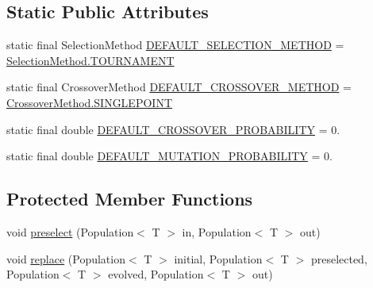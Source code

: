 \subsection*{Static Public Attributes}
\begin{DoxyCompactItemize}
\item 
static final Selection\-Method \hyperlink{classjenes_1_1stage_1_1operator_1_1common_1_1_deterministic_crowder_3_01_t_01extends_01_chromosome_01_4_a5ca3f3abce0f3163383ed9158b154289}{D\-E\-F\-A\-U\-L\-T\-\_\-\-S\-E\-L\-E\-C\-T\-I\-O\-N\-\_\-\-M\-E\-T\-H\-O\-D} = \hyperlink{enumjenes_1_1stage_1_1operator_1_1common_1_1_deterministic_crowder_3_01_t_01extends_01_chromosome_01_4_1_1_selection_method_acf3d13065b946fb2e0e86d3cf8ca49fd}{Selection\-Method.\-T\-O\-U\-R\-N\-A\-M\-E\-N\-T}
\item 
static final Crossover\-Method \hyperlink{classjenes_1_1stage_1_1operator_1_1common_1_1_deterministic_crowder_3_01_t_01extends_01_chromosome_01_4_aa09cba6e344d7681789f11213d6cccd0}{D\-E\-F\-A\-U\-L\-T\-\_\-\-C\-R\-O\-S\-S\-O\-V\-E\-R\-\_\-\-M\-E\-T\-H\-O\-D} = \hyperlink{enumjenes_1_1stage_1_1operator_1_1common_1_1_deterministic_crowder_3_01_t_01extends_01_chromosome_01_4_1_1_crossover_method_a074512cc7f136f107813809e5422d0d5}{Crossover\-Method.\-S\-I\-N\-G\-L\-E\-P\-O\-I\-N\-T}
\item 
static final double \hyperlink{classjenes_1_1stage_1_1operator_1_1common_1_1_deterministic_crowder_3_01_t_01extends_01_chromosome_01_4_a824ea51baffd4e4b2fb045d38b964321}{D\-E\-F\-A\-U\-L\-T\-\_\-\-C\-R\-O\-S\-S\-O\-V\-E\-R\-\_\-\-P\-R\-O\-B\-A\-B\-I\-L\-I\-T\-Y} = 0.
\item 
static final double \hyperlink{classjenes_1_1stage_1_1operator_1_1common_1_1_deterministic_crowder_3_01_t_01extends_01_chromosome_01_4_a5a4e77ddc158a661371ea5934cce2977}{D\-E\-F\-A\-U\-L\-T\-\_\-\-M\-U\-T\-A\-T\-I\-O\-N\-\_\-\-P\-R\-O\-B\-A\-B\-I\-L\-I\-T\-Y} = 0.
\end{DoxyCompactItemize}
\subsection*{Protected Member Functions}
\begin{DoxyCompactItemize}
\item 
void \hyperlink{classjenes_1_1stage_1_1operator_1_1common_1_1_deterministic_crowder_3_01_t_01extends_01_chromosome_01_4_aee04796d9d0ad969443b30cc88a1b964}{preselect} (Population$<$ T $>$ in, Population$<$ T $>$ out)
\item 
void \hyperlink{classjenes_1_1stage_1_1operator_1_1common_1_1_deterministic_crowder_3_01_t_01extends_01_chromosome_01_4_a8d9591e3962f36f1f2f59be9395806b4}{replace} (Population$<$ T $>$ initial, Population$<$ T $>$ preselected, Population$<$ T $>$ evolved, Population$<$ T $>$ out)
\end{DoxyCompactItemize}
